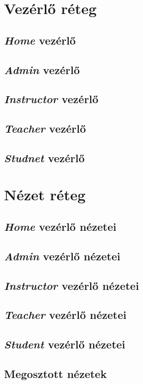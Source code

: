\section{Vezérlő réteg}
\label{sec:controller}
\subsection{\emph{Home} vezérlő}
\subsection{\emph{Admin} vezérlő}
\subsection{\emph{Instructor} vezérlő}
\subsection{\emph{Teacher} vezérlő}
\subsection{\emph{Studnet} vezérlő}
\section{Nézet réteg}
\label{sec:view}
\subsection{\emph{Home} vezérlő nézetei}
\subsection{\emph{Admin} vezérlő nézetei}
\subsection{\emph{Instructor} vezérlő nézetei}
\subsection{\emph{Teacher} vezérlő nézetei}
\subsection{\emph{Student} vezérlő nézetei}
\subsection{Megosztott nézetek}
